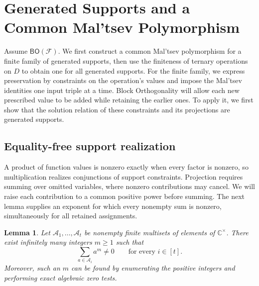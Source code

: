 \documentclass[11pt,letterpaper,onecolumn]{article}
\theoremstyle{plain}
\newtheorem{lemma}[lemma]{Lemma}
\theoremstyle{definition}
\theoremstyle{remark}
\newcommand{\AlgNums}{\mathbb C}
\newcommand{\cF}{\mathcal F}
\newcommand{\BO}{\mathsf{BO}}
\begin{document}
\section{Generated Supports and a Common Mal'tsev Polymorphism}
\label{sec:generated-supports}

Assume $\BO(\cF)$.  We first construct a common Mal'tsev polymorphism
for a finite family of generated supports, then use the finiteness of
ternary operations on $D$ to obtain one for all generated supports.
For the finite family, we express preservation by constraints on the
operation's values and impose the Mal'tsev identities one input triple
at a time.  Block Orthogonality will allow each new prescribed value to
be added while retaining the earlier ones.  To apply it, we first show
that the solution relation of these constraints and its projections
are generated supports.

\subsection{Equality-free support realization}

A product of function values is nonzero exactly when every factor is
nonzero, so multiplication realizes conjunctions of support constraints.
Projection requires summing over omitted variables, where nonzero
contributions may cancel.  We will raise each contribution to a common
positive power before summing.  The next lemma supplies an exponent for
which every nonempty sum is nonzero, simultaneously for all retained
assignments.

\begin{lemma}
\label{lem:simultaneous-power-sums}
Let $\mathcal A_1,\ldots,\mathcal A_t$ be nonempty finite multisets of
elements of $\AlgNums^\times$.  There exist infinitely many integers $m\ge1$
such that
\begin{equation}
  \sum_{a\in\mathcal A_i}a^m\ne0
  \qquad\text{for every }i\in[t].
  \label{eq:simultaneous-power-sums}
\end{equation}
Moreover, such an $m$ can be found by enumerating the positive integers and
performing exact algebraic zero tests.
\end{lemma}
\end{document}
